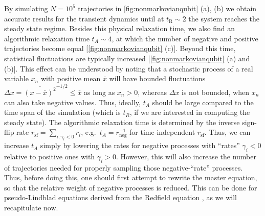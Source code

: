 \documentclass[twocolumn,prl,superscriptaddress]{revtex4-2}
\begin{document}
By simulating $N=10^5$ trajectories in \cref{fig:nonmarkovianqubit} (a), (b) we obtain accurate results for the transient dynamics until at $t_\mathrm{R}\sim 2$ the system reaches the steady state regime. Besides this physical relaxation time, we also find an algorithmic relaxation time $t_A \sim 4$, at which the number of negative and positive trajectories become equal [\cref{fig:nonmarkovianqubit} (c)]. Beyond this time, statistical fluctuations are typically increased [\cref{fig:nonmarkovianqubit} (a) and (b)]. This effect can be understood by noting that a stochastic process of a real variable $x_n$ with positive mean $\overline{x}$ will have  bounded fluctuations $\Delta x = \overline{(x-\overline{x})^2}^{-1/2}\leq \overline{x}$ as long as $x_n>0$, whereas $\Delta x$ is not bounded, when $x_n$ can also take negative values. Thus, ideally, $t_A$ should be large compared to the time span of the simulation (which is $t_R$, if we are interested in computing the steady state). The algorithmic relaxation time is determined by the inverse sign-flip rate $r_\text{sf}=\sum_{i,\gamma_i<0} r_i$, e.g.~$t_A =r_\text{neg}^{-1}$ for time-independent $r_\text{sf}$. Thus, we can increase $t_A$ simply by lowering the rates for negative processes with “rates” $\gamma_i<0$ relative to positive ones with $\gamma_i>0$. However, this will also increase the number of trajectories needed for properly sampling those negative-“rate” processes. Thus, before doing this, one should first attempt to rewrite the master equation, so that the relative weight of negative processes is reduced. This can be done for pseudo-Lindblad equations derived from the Redfield equation \cite{TBecker2021}, as we will recapitulate now.
\end{document}

